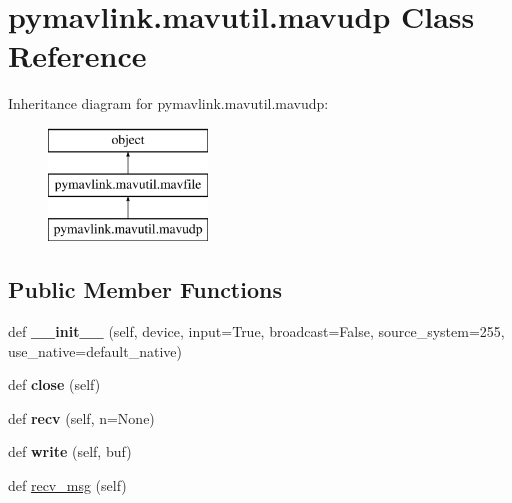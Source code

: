 \hypertarget{classpymavlink_1_1mavutil_1_1mavudp}{}\section{pymavlink.\+mavutil.\+mavudp Class Reference}
\label{classpymavlink_1_1mavutil_1_1mavudp}
Inheritance diagram for pymavlink.\+mavutil.\+mavudp\+:\begin{figure}[H]
\begin{center}
\leavevmode
\includegraphics[height=3.000000cm]{classpymavlink_1_1mavutil_1_1mavudp}
\end{center}
\end{figure}
\subsection*{Public Member Functions}
\begin{DoxyCompactItemize}
\item 
\mbox{\label{classpymavlink_1_1mavutil_1_1mavudp_addc5525a989302af3f80c46d6fe1aad7}} 
def {\bfseries \+\_\+\+\_\+init\+\_\+\+\_\+} (self, device, input=True, broadcast=False, source\+\_\+system=255, use\+\_\+native=default\+\_\+native)
\item 
\mbox{\label{classpymavlink_1_1mavutil_1_1mavudp_ae4b43c09ce3d1304545c9a333bec9cff}} 
def {\bfseries close} (self)
\item 
\mbox{\label{classpymavlink_1_1mavutil_1_1mavudp_a0381f8262ab6149604e902339c5a4a53}} 
def {\bfseries recv} (self, n=None)
\item 
\mbox{\label{classpymavlink_1_1mavutil_1_1mavudp_a517fd3e5a3ad03f03ba505ff8b4d7572}} 
def {\bfseries write} (self, buf)
\item 
def \hyperlink{classpymavlink_1_1mavutil_1_1mavudp_aeb1b82765793d5de815c95caf6863953}{recv\+\_\+msg} (self)
\end{DoxyCompactItemize}
